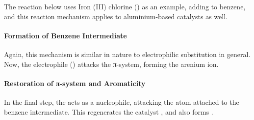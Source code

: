 					The reaction below uses Iron (III) chlorine () as an example, adding \ch{\chlorine} to benzene, and this reaction
					mechanism applies to aluminium-based catalysts as well.



					\pagebreak
					\paragraph{Formation of Benzene Intermediate}

					Again, this mechanism is similar in nature to electrophilic substitution in general. Now, the electrophile () attacks
					the π-system, forming the arenium ion.



					\paragraph{Restoration of π-system and Aromaticity}

					In the final step, the  acts as a nucleophile, attacking the  atom attached to the benzene intermediate. This
					regenerates the catalyst , and also forms .


